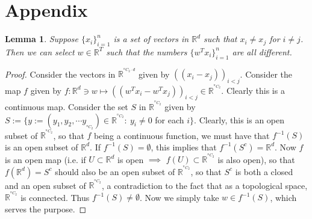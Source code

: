 \documentclass[a4paper,11pt]{amsart}
\newcommand*{\Comb}[2]{{}^{#1}C_{#2}}%
\theoremstyle{definition}
\theoremstyle{plain}
\newtheorem{lmma}[dfn]{Lemma}
\theoremstyle{remark}
\newtheorem{rmrk}[dfn]{Remark}
\newcommand{\IR}{\mathbb{R}}
\begin{document}


\section{Appendix}\label{Appendix}
\begin{lmma}
Suppose $\{x_i\}_{i=1}^n$ is a set of vectors in $\IR^d$ such that $x_i\neq x_j$ for $i\neq j$. Then we can select $w\in\IR^T$ such that the numbers $\{w^Tx_i\}_{i=1}^n$ are all different.
\end{lmma}
\begin{proof}
Consider the vectors in $\IR^{^{\Comb{n}{2}\cdot d}}$ given by $((x_i-x_j))_{i<j}$. Consider the map $f$ given by $f:\IR^d\ni w\mapsto ((w^Tx_i-w^Tx_j))_{i<j}\in\IR^{^{\Comb{n}{2}}}$. Clearly this is a continuous map. Consider the set $S$ in $\IR^{^{\Comb{n}{2}}}$ given by $S:=\{y:=(y_1,y_2,\cdots y_{_{\Comb{n}{2}}})\in\IR^{^{\Comb{n}{2}}}:~y_i\neq0$ for each $i\}$. Clearly, this is an open subset of $\IR^{^{\Comb{n}{2}}}$, so that $f$ being a continuous function, we must have that $f^{-1}(S)$ is an open subset of $\IR^d$. If $f^{-1}(S)=\emptyset$, this implies that $f^{-1}(S^c)=\IR^d$. Now $f$ is an open map (i.e. if $U\subset\IR^d$ is open $\implies$ $f(U)\subset\IR^{^{\Comb{n}{2}}}$ is also open), so that $f(\IR^d)=S^c$ should also be an open subset of $\IR^{^{\Comb{n}{2}}}$, so that $S^c$ is both a closed and an open subset of $\IR^{^{\Comb{n}{2}}}$, a contradiction to the fact that as a topological space, $\IR^{^{\Comb{n}{2}}}$ is connected. Thus $f^{-1}(S)\neq\emptyset$. Now we simply take $w\in f^{-1}(S)$, which serves the purpose.
\end{proof}
\end{document}
